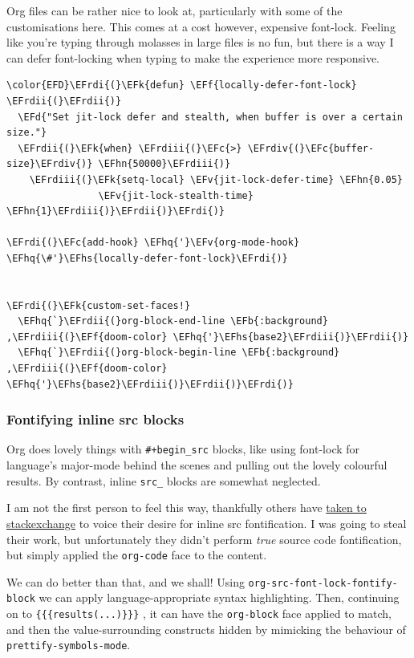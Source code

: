\documentclass{scrartcl}
\newcommand{\EFk}[1]{\textcolor{EFk}{#1}} %
\newcommand{\EFd}[1]{\textcolor{EFd}{\textit{#1}}} %
\newcommand{\EFb}[1]{\textcolor{EFb}{#1}} %
\newcommand{\EFc}[1]{\textcolor{EFc}{#1}} %
\newcommand{\EFv}[1]{\textcolor{EFv}{#1}} %
\newcommand{\EFf}[1]{\textcolor{EFf}{#1}} %
\newcommand{\EFhn}[1]{\textcolor{EFhn}{\textbf{#1}}} %
\newcommand{\EFhq}[1]{\textcolor{EFhq}{#1}} %
\newcommand{\EFhs}[1]{\textcolor{EFhs}{#1}} %
\newcommand{\EFrdi}[1]{\textcolor{EFrdi}{#1}} %
\newcommand{\EFrdii}[1]{\textcolor{EFrdii}{#1}} %
\newcommand{\EFrdiii}[1]{\textcolor{EFrdiii}{#1}} %
\newcommand{\EFrdiv}[1]{\textcolor{EFrdiv}{#1}} %
\begin{document}
Org files can be rather nice to look at, particularly with some of the
customisations here. This comes at a cost however, expensive font-lock.
Feeling like you're typing through molasses in large files is no fun, but there
is a way I can defer font-locking when typing to make the experience more
responsive.
\begin{Code}
\begin{Verbatim}[]
\color{EFD}\EFrdi{(}\EFk{defun} \EFf{locally-defer-font-lock} \EFrdii{(}\EFrdii{)}
  \EFd{"Set jit-lock defer and stealth, when buffer is over a certain size."}
  \EFrdii{(}\EFk{when} \EFrdiii{(}\EFc{>} \EFrdiv{(}\EFc{buffer-size}\EFrdiv{)} \EFhn{50000}\EFrdiii{)}
    \EFrdiii{(}\EFk{setq-local} \EFv{jit-lock-defer-time} \EFhn{0.05}
                \EFv{jit-lock-stealth-time} \EFhn{1}\EFrdiii{)}\EFrdii{)}\EFrdi{)}

\EFrdi{(}\EFc{add-hook} \EFhq{'}\EFv{org-mode-hook} \EFhq{\#'}\EFhs{locally-defer-font-lock}\EFrdi{)}


\EFrdi{(}\EFk{custom-set-faces!}
  \EFhq{`}\EFrdii{(}org-block-end-line \EFb{:background} ,\EFrdiii{(}\EFf{doom-color} \EFhq{'}\EFhs{base2}\EFrdiii{)}\EFrdii{)}
  \EFhq{`}\EFrdii{(}org-block-begin-line \EFb{:background} ,\EFrdiii{(}\EFf{doom-color} \EFhq{'}\EFhs{base2}\EFrdiii{)}\EFrdii{)}\EFrdi{)}
\end{Verbatim}
\end{Code}

\subsubsection{Fontifying inline src blocks}
\label{sec:org25f5e1b}
Org does lovely things with \texttt{\#+begin\_src} blocks, like using font-lock for
language's major-mode behind the scenes and pulling out the lovely colourful
results. By contrast, inline \texttt{src\_} blocks are somewhat neglected.

I am not the first person to feel this way, thankfully others have \href{https://stackoverflow.com/questions/20309842/how-to-syntax-highlight-for-org-mode-inline-source-code-src-lang/28059832}{taken to
stackexchange} to voice their desire for inline src fontification. I was going to
steal their work, but unfortunately they didn't perform \emph{true} source code
fontification, but simply applied the \texttt{org-code} face to the content.

We can do better than that, and we shall! Using \texttt{org-src-font-lock-fontify-block}
we can apply language-appropriate syntax highlighting. Then, continuing on to
\texttt{\{\{\{results(...)\}\}\}} , it can have the \texttt{org-block} face applied to match, and then
the value-surrounding constructs hidden by mimicking the behaviour of
\texttt{prettify-symbols-mode}.
\end{document}
